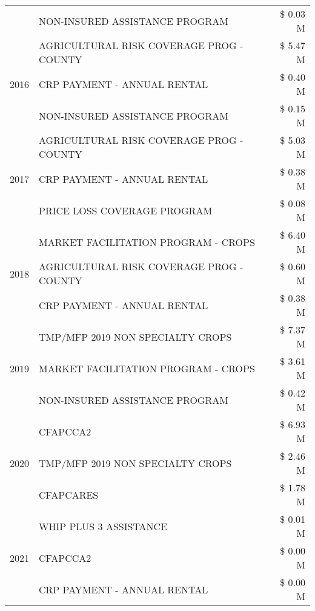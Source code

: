 \begin{tabular}{llr}
 & NON-INSURED ASSISTANCE PROGRAM & \$ 0.03 M \\
\cline{1-3}
\multirow[t]{3}{*}{2016} & AGRICULTURAL RISK COVERAGE PROG - COUNTY & \$ 5.47 M \\
 & CRP PAYMENT - ANNUAL RENTAL & \$ 0.40 M \\
 & NON-INSURED ASSISTANCE PROGRAM & \$ 0.15 M \\
\cline{1-3}
\multirow[t]{3}{*}{2017} & AGRICULTURAL RISK COVERAGE PROG - COUNTY & \$ 5.03 M \\
 & CRP PAYMENT - ANNUAL RENTAL & \$ 0.38 M \\
 & PRICE LOSS COVERAGE PROGRAM & \$ 0.08 M \\
\cline{1-3}
\multirow[t]{3}{*}{2018} & MARKET FACILITATION PROGRAM - CROPS & \$ 6.40 M \\
 & AGRICULTURAL RISK COVERAGE PROG - COUNTY & \$ 0.60 M \\
 & CRP PAYMENT - ANNUAL RENTAL & \$ 0.38 M \\
\cline{1-3}
\multirow[t]{3}{*}{2019} & TMP/MFP 2019 NON SPECIALTY CROPS & \$ 7.37 M \\
 & MARKET FACILITATION PROGRAM - CROPS & \$ 3.61 M \\
 & NON-INSURED ASSISTANCE PROGRAM & \$ 0.42 M \\
\cline{1-3}
\multirow[t]{3}{*}{2020} & CFAPCCA2 & \$ 6.93 M \\
 & TMP/MFP 2019 NON SPECIALTY CROPS & \$ 2.46 M \\
 & CFAPCARES & \$ 1.78 M \\
\cline{1-3}
\multirow[t]{3}{*}{2021} & WHIP PLUS 3 ASSISTANCE & \$ 0.01 M \\
 & CFAPCCA2 & \$ 0.00 M \\
 & CRP PAYMENT - ANNUAL RENTAL & \$ 0.00 M \\
\cline{1-3}
\bottomrule
\end{tabular}
